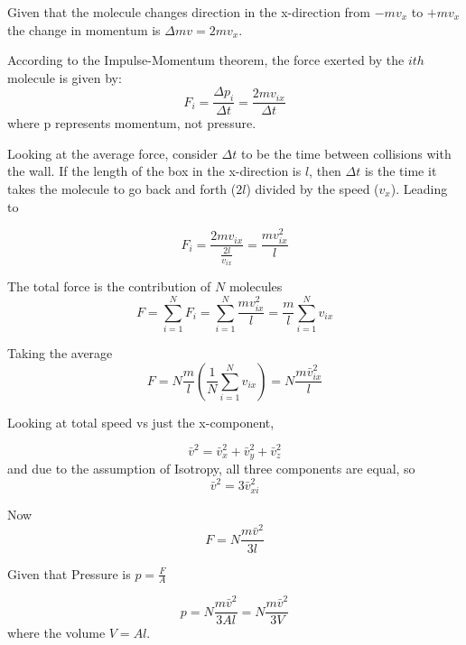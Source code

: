 \documentclass[14pt]{memoir}
\begin{document}
Given that the molecule changes direction in the x-direction from $-mv_x$ to $+mv_x$ the change in momentum is $\Delta mv = 2 m v_x$. 

According to the Impulse-Momentum theorem, the force exerted by the $ith$ molecule is given by:
\begin{equation}
F_i = \frac{\Delta p_i}{\Delta t} = \frac{2 m v_{ix}}{\Delta t}
\end{equation}
where p represents momentum, not pressure. 

Looking at the average force, consider $\Delta t$ to be the time between collisions with the wall. If the length of the box in the x-direction is $l$, then $\Delta t$ is the time it takes the molecule to go back and forth ($2l$) divided by the speed ($v_x$). Leading to

\begin{equation}
F_i = \frac{2 m v_{ix}}{\frac{2l}{v_{ix}}} = \frac{m v_{ix}^2}{l}
\end{equation}

The total force is the contribution of $N$ molecules
\begin{equation}
F = \sum_{i=1}^N F_i = \sum_{i=1}^N \frac{m v_{ix}^2}{l} = \frac{m}{l} \sum_{i=1}^N  v_{ix}
\end{equation}

Taking the average
\begin{equation}
F = N \frac{m}{l} (\frac{1}{N} \sum_{i=1}^N   v_{ix}) = N \frac{m \bar{v}_{ix}^2}{l}
\end{equation}


Looking at total speed vs just the x-component,

\begin{equation}
\bar{v}^2 = \bar{v}_{x}^2 + \bar{v}_{y}^2 + \bar{v}_{z}^2
\end{equation}
and due to the assumption of Isotropy, all three components are equal, so
\begin{equation}
\bar{v}^2 = 3 \bar{v}_{xi}^2
\end{equation}

Now
\begin{equation}
F = N \frac{m \bar{v}^2}{3l}
\end{equation}

Given that Pressure is $p = \frac{F}{A}$

\begin{equation}
p = N \frac{m \bar{v}^2}{3Al} = N \frac{m \bar{v}^2}{3V} 
\end{equation}
where the volume $V = Al$.
\end{document}
